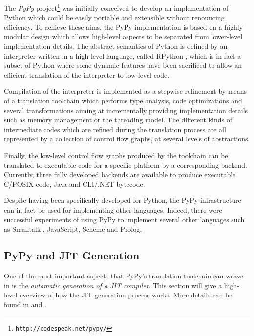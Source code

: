The \emph{PyPy} project\footnote{\texttt{http://codespeak.net/pypy/}}
\cite{RigoPedroni06} was initially conceived to develop an implementation of Python which
could be easily portable and extensible without renouncing efficiency.
To achieve these aims, the PyPy implementation is based on a highly
modular design which allows high-level aspects
to be separated from lower-level implementation details.
The abstract semantics of Python is defined by an interpreter written
in a high-level language, called RPython \cite{AACM-DLS07}, which is in fact a subset of
Python where some dynamic features have been sacrificed to allow an
efficient translation of the interpreter to low-level code.

Compilation of the interpreter is implemented as a stepwise
refinement by means of a translation toolchain which performs type
analysis, code optimizations and several transformations aiming at 
incrementally providing implementation details such as memory management or the threading model.
The different kinds of intermediate codes  which are refined 
during the translation process are all represented by a collection of control flow graphs,
at several levels of abstractions.

Finally, the low-level control flow graphs produced by the toolchain
can be translated to executable code for a specific platform by a
corresponding backend.
Currently, three fully developed backends are available to produce
executable C/POSIX code, Java and CLI/.NET bytecode. 

Despite having been specifically developed for Python, the PyPy infrastructure
can in fact be used for implementing other languages. Indeed, there were
successful experiments of using PyPy to implement several other languages such
as Smalltalk \cite{BolzEtAl08}, JavaScript, Scheme and Prolog.


\subsection{PyPy and JIT-Generation}
\label{sec:jitgen}

One of the most important aspects that PyPy's translation toolchain can weave
in is the \emph{automatic generation of a JIT compiler}.  This section will
give a high-level overview of how the JIT-generation process works. More
details can be found in \cite{PyPyJIT} and \cite{PyPyJIT09}.


